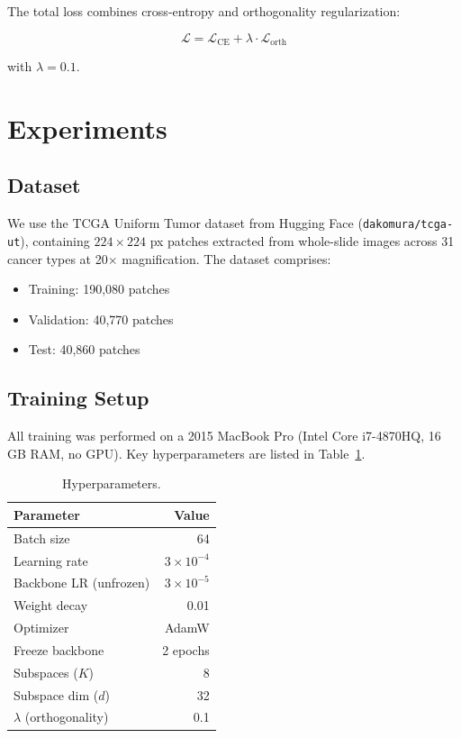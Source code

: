 \documentclass[11pt,twocolumn]{article}
\begin{document}
The total loss combines cross-entropy and orthogonality regularization:

\begin{equation}
    \mathcal{L} = \mathcal{L}_{\text{CE}} + \lambda \cdot \mathcal{L}_{\text{orth}}
\end{equation}

with $\lambda = 0.1$.

\section{Experiments}

\subsection{Dataset}

We use the TCGA Uniform Tumor dataset \cite{tcga2024} from Hugging Face (\texttt{dakomura/tcga-ut}), containing $224\times224$ px patches extracted from whole-slide images across 31 cancer types at 20$\times$ magnification. The dataset comprises:

\begin{itemize}[nosep]
    \item Training: 190,080 patches
    \item Validation: 40,770 patches
    \item Test: 40,860 patches
\end{itemize}

\subsection{Training Setup}

All training was performed on a 2015 MacBook Pro (Intel Core i7-4870HQ, 16 GB RAM, no GPU). Key hyperparameters are listed in Table~\ref{tab:hyperparams}.

\begin{table}[t]
    \centering
    \caption{Hyperparameters.}
    \label{tab:hyperparams}
    \begin{tabular}{lr}
        \toprule
        Parameter & Value \\
        \midrule
        Batch size & 64 \\
        Learning rate & $3\times10^{-4}$ \\
        Backbone LR (unfrozen) & $3\times10^{-5}$ \\
        Weight decay & 0.01 \\
        Optimizer & AdamW \\
        Freeze backbone & 2 epochs \\
        Subspaces ($K$) & 8 \\
        Subspace dim ($d$) & 32 \\
        $\lambda$ (orthogonality) & 0.1 \\
        \bottomrule
    \end{tabular}
\end{table}
\end{document}
